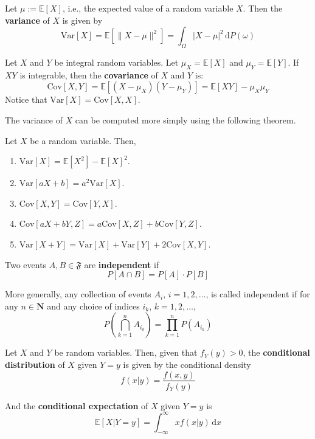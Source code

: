 \begin{definition}[Variance]
	Let $\mu := \mathbb{E}[X]$, i.e., the expected value of a random variable $X$. Then the \textbf{variance} of $X$ is given by
	\[
		\text{Var}[X] = \mathbb{E}[\|X - \mu\|^2] = \int_{\Omega} |X - \mu|^2 \, \mathrm{d} P(\omega)
	\]
\end{definition}

\begin{definition}[Covariance]
	Let $X$ and $Y$ be integral random variables. Let $\mu_X = \mathbb{E}[X]$ and $\mu_Y = \mathbb{E}[Y]$. If $XY$ is integrable, then the \textbf{covariance} of $X$ and $Y$ is:
	\[
		\text{Cov}[X,Y] = \mathbb{E}[(X-\mu_X)(Y-\mu_Y)] = \mathbb{E}[XY]-\mu_X \mu_Y
	\]
	Notice that $\text{Var}[X] = \text{Cov}[X,X]$.
\end{definition}

The variance of $X$ can be computed more simply using the following theorem.

\begin{theorem}
	Let $X$ be a random variable. Then,
	\begin{enumerate}
		\item $\text{Var}[X] = \mathbb{E}[X^2] - \mathbb{E}[X]^2$.
		\item $\text{Var}[aX+b] = a^2 \text{Var}[X]$.
		\item $\text{Cov}[X,Y] = \text{Cov}[Y,X]$.
		\item $\text{Cov}[aX+bY,Z] = a \text{Cov}[X,Z] + b \text{Cov}[Y,Z]$.
		\item $\text{Var}[X+Y] = \text{Var}[X] + \text{Var}[Y] + 2 \text{Cov}[X,Y]$.
	\end{enumerate}		
\end{theorem}

\begin{definition}[Independence]
	Two events $A, B \in \mathfrak{F}$ are \textbf{independent} if
	\[
		P[A \cap B] = P[A]\cdot P[B]
	\]
	
	More generally, any collection of events $A_i$, $i = 1,2,\ldots$, is called independent if for any $n \in \textbf{N}$ and any choice of indices $i_k$, $k = 1, 2, \ldots$, 
	\[
		P \left( \bigcap_{k=1}^n A_{i_k} \right) = \prod_{k=1}^n P\left( A_{i_k} \right)
	\]
\end{definition}

\begin{definition}
	Let $X$ and $Y$ be random variables. Then, given that $f_Y(y) > 0$, the \textbf{conditional distribution} of $X$ given $Y=y$ is given by the conditional density
	\[
		f(x|y) = \frac{f(x,y)}{f_Y(y)}
	\]
	
	And the \textbf{conditional expectation} of $X$ given $Y=y$ is
	\[
		\mathbb{E} [X| Y = y] = \int_{-\infty}^\infty x f(x|y) \, \mathrm{d}x
	\]
\end{definition}

